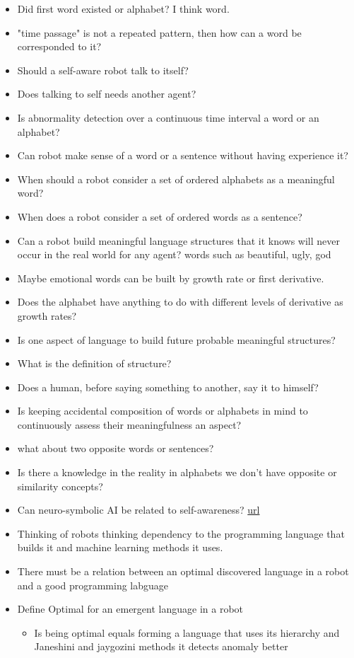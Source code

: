 \begin{itemize}
    \item Did first word existed or alphabet? I think word.
    \item "time passage" is not a repeated pattern, then how can a word be corresponded to it?
    \item Should a self-aware robot talk to itself?
    \item Does talking to self needs another agent?
    \item Is abnormality detection over a continuous time interval a word or an alphabet?
    \item Can robot make sense of a word or a sentence without having experience it?
    \item When should a robot consider a set of ordered alphabets as a meaningful word?
    \item When does a robot consider a set of ordered words as a sentence?
    \item Can a robot build meaningful language structures that it knows will never occur in the real world for any agent? words such as beautiful, ugly, god
    \item Maybe emotional words can be built by growth rate or first derivative.
    \item Does the alphabet have anything to do with different levels of derivative as growth rates?
    \item Is one aspect of language to build future probable meaningful structures?
    \item What is the definition of structure?
    \item Does a human, before saying something to another, say it to himself?
    \item Is keeping accidental composition of words or alphabets in mind to continuously assess their meaningfulness an aspect?
    \item what about two opposite words or sentences?
    \item Is there a knowledge in the reality in alphabets we don't have opposite or similarity concepts?
    \item Can neuro-symbolic AI be related to self-awareness? \href{https://en.wikipedia.org/wiki/Neuro-symbolic_AI}{url}
    \item Thinking of robots thinking dependency to the programming language that builds it and machine learning methods it uses.
    \item There must be a relation between an optimal discovered language in a robot and a good programming labguage
    \item Define Optimal for an emergent language in a robot
        \begin{itemize}
            \item Is being optimal equals forming a language that uses its hierarchy and Janeshini and jaygozini methods it detects anomaly better
        \end{itemize}
\end{itemize}